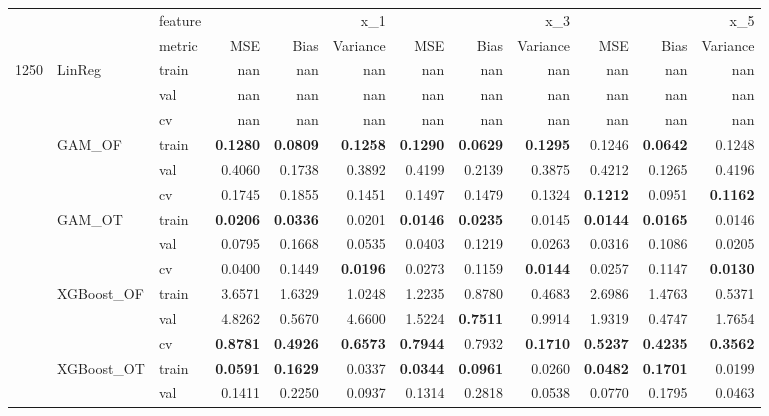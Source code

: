 \begin{tabular}{lllrrrrrrrrr}
 &  & feature & \multicolumn{3}{r}{x_1} & \multicolumn{3}{r}{x_3} & \multicolumn{3}{r}{x_5} \\
 &  & metric & MSE & Bias & Variance & MSE & Bias & Variance & MSE & Bias & Variance \\
\multirow[c]{15}{*}{1250} & \multirow[c]{3}{*}{LinReg} & train & nan & nan & nan & nan & nan & nan & nan & nan & nan \\
 &  & val & nan & nan & nan & nan & nan & nan & nan & nan & nan \\
 &  & cv & nan & nan & nan & nan & nan & nan & nan & nan & nan \\
 & \multirow[c]{3}{*}{GAM_OF} & train & \bfseries 0.1280 & \bfseries 0.0809 & \bfseries 0.1258 & \bfseries 0.1290 & \bfseries 0.0629 & \bfseries 0.1295 & 0.1246 & \bfseries 0.0642 & 0.1248 \\
 &  & val & 0.4060 & 0.1738 & 0.3892 & 0.4199 & 0.2139 & 0.3875 & 0.4212 & 0.1265 & 0.4196 \\
 &  & cv & 0.1745 & 0.1855 & 0.1451 & 0.1497 & 0.1479 & 0.1324 & \bfseries 0.1212 & 0.0951 & \bfseries 0.1162 \\
 & \multirow[c]{3}{*}{GAM_OT} & train & \bfseries 0.0206 & \bfseries 0.0336 & 0.0201 & \bfseries 0.0146 & \bfseries 0.0235 & 0.0145 & \bfseries 0.0144 & \bfseries 0.0165 & 0.0146 \\
 &  & val & 0.0795 & 0.1668 & 0.0535 & 0.0403 & 0.1219 & 0.0263 & 0.0316 & 0.1086 & 0.0205 \\
 &  & cv & 0.0400 & 0.1449 & \bfseries 0.0196 & 0.0273 & 0.1159 & \bfseries 0.0144 & 0.0257 & 0.1147 & \bfseries 0.0130 \\
 & \multirow[c]{3}{*}{XGBoost_OF} & train & 3.6571 & 1.6329 & 1.0248 & 1.2235 & 0.8780 & 0.4683 & 2.6986 & 1.4763 & 0.5371 \\
 &  & val & 4.8262 & 0.5670 & 4.6600 & 1.5224 & \bfseries 0.7511 & 0.9914 & 1.9319 & 0.4747 & 1.7654 \\
 &  & cv & \bfseries 0.8781 & \bfseries 0.4926 & \bfseries 0.6573 & \bfseries 0.7944 & 0.7932 & \bfseries 0.1710 & \bfseries 0.5237 & \bfseries 0.4235 & \bfseries 0.3562 \\
 & \multirow[c]{3}{*}{XGBoost_OT} & train & \bfseries 0.0591 & \bfseries 0.1629 & 0.0337 & \bfseries 0.0344 & \bfseries 0.0961 & 0.0260 & \bfseries 0.0482 & \bfseries 0.1701 & 0.0199 \\
 &  & val & 0.1411 & 0.2250 & 0.0937 & 0.1314 & 0.2818 & 0.0538 & 0.0770 & 0.1795 & 0.0463 \\

\end{tabular}
